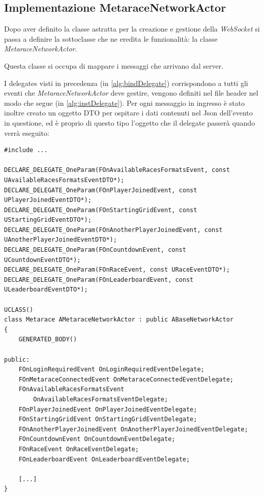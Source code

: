     \subsection{Implementazione MetaraceNetworkActor}

    Dopo aver definito la classe astratta per la creazione e gestione della \textit{WebSocket} si passa a definire la sottoclasse che ne eredita le funzionalità: la classe \textit{MetaraceNetworkActor}.

    Questa classe si occupa di mappare i messaggi che arrivano dal server.

    I delegates visti in precedenza (in \ref{alg:bindDelegate}) corrispondono a tutti gli eventi che \textit{MetaraceNetworkActor} deve gestire, vengono definiti nel file header nel modo che segue (in \ref{alg:instDelegate}). 
    Per ogni messaggio in ingresso è stato inoltre creato un oggetto DTO per ospitare i dati contenuti nel Json dell'evento in questione, ed è proprio di questo tipo l'oggetto che il delegate passerà quando verrà eseguito:

\label{alg:instDelegate}
\begin{lstlisting}[caption = Dichiarazione delegate nel file header di MetaraceNetworkActor]
#include ...

DECLARE_DELEGATE_OneParam(FOnAvailableRacesFormatsEvent, const UAvailableRacesFormatsEventDTO*);
DECLARE_DELEGATE_OneParam(FOnPlayerJoinedEvent, const UPlayerJoinedEventDTO*);
DECLARE_DELEGATE_OneParam(FOnStartingGridEvent, const UStartingGridEventDTO*);
DECLARE_DELEGATE_OneParam(FOnAnotherPlayerJoinedEvent, const UAnotherPlayerJoinedEventDTO*);
DECLARE_DELEGATE_OneParam(FOnCountdownEvent, const UCountdownEventDTO*);
DECLARE_DELEGATE_OneParam(FOnRaceEvent, const URaceEventDTO*);
DECLARE_DELEGATE_OneParam(FOnLeaderboardEvent, const ULeaderboardEventDTO*);

UCLASS()
class Metarace AMetaraceNetworkActor : public ABaseNetworkActor
{
    GENERATED_BODY()

public:
    FOnLoginRequiredEvent OnLoginRequiredEventDelegate;
    FOnMetaraceConnectedEvent OnMetaraceConnectedEventDelegate;
    FOnAvailableRacesFormatsEvent 
        OnAvailableRacesFormatsEventDelegate;
    FOnPlayerJoinedEvent OnPlayerJoinedEventDelegate;
    FOnStartingGridEvent OnStartingGridEventDelegate;
    FOnAnotherPlayerJoinedEvent OnAnotherPlayerJoinedEventDelegate;
    FOnCountdownEvent OnCountdownEventDelegate;
    FOnRaceEvent OnRaceEventDelegate;
    FOnLeaderboardEvent OnLeaderboardEventDelegate;

    [...]
}
\end{lstlisting}

